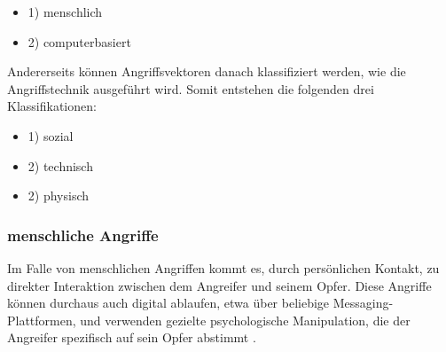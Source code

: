 \begin{minipage}{.5\linewidth}
    \begin{itemize}
        \setlength\itemsep{1em}
        \item 1) menschlich
        \item 2) computerbasiert
    \end{itemize}
\end{minipage}
\hfill
\begin{minipage}{.5\linewidth}
    \centering
\end{minipage}

Andererseits können Angriffsvektoren danach klassifiziert werden, wie die Angriffstechnik ausgeführt wird.
Somit entstehen die folgenden drei Klassifikationen:

\begin{minipage}{.5\linewidth}
    \begin{itemize}
        \setlength\itemsep{1em}
        \item 1) sozial
        \item 2) technisch
        \item 2) physisch
    \end{itemize}
\end{minipage}
\hfill
\begin{minipage}{.5\linewidth}
    \centering
\end{minipage}

\subsubsection{menschliche Angriffe}
Im Falle von menschlichen Angriffen kommt es, durch persönlichen Kontakt, zu direkter Interaktion zwischen dem Angreifer und seinem Opfer.
Diese Angriffe können durchaus auch digital ablaufen, etwa über beliebige Messaging-Plattformen, und verwenden gezielte psychologische Manipulation,
die der Angreifer spezifisch auf sein Opfer abstimmt .

